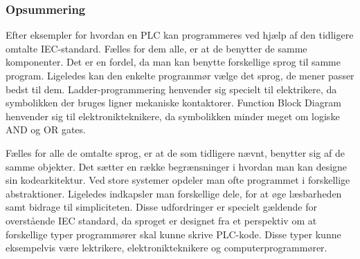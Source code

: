 
\subsubsection{Opsummering}

\noindent Efter eksempler for hvordan en PLC kan programmeres ved hjælp af den tidligere omtalte IEC-standard. Fælles for dem alle, er at de benytter de samme komponenter. Det er en fordel, da man kan benytte forskellige sprog til samme program. Ligeledes kan den enkelte programmør vælge det sprog, de mener passer bedst til dem. Ladder-programmering henvender sig specielt til elektrikere, da symbolikken der bruges ligner mekaniske kontaktorer. Function Block Diagram henvender sig til elektronikteknikere, da symbolikken minder meget om logiske AND og OR gates.

Fælles for alle de omtalte sprog, er at de som tidligere nævnt, benytter sig af de samme objekter. Det sætter en række begrænsninger i hvordan man kan designe sin kodearkitektur. Ved store systemer opdeler man ofte programmet i forskellige abstraktioner. Ligeledes indkapsler man forskellige dele, for at øge læsbarheden samt bidrage til simpliciteten. Disse udfordringer er specielt gældende for overstående IEC standard, da sproget er designet fra et perspektiv om at forskellige typer programmører skal kunne skrive PLC-kode. Disse typer kunne eksempelvis være lektrikere, elektronikteknikere og computerprogrammører.




